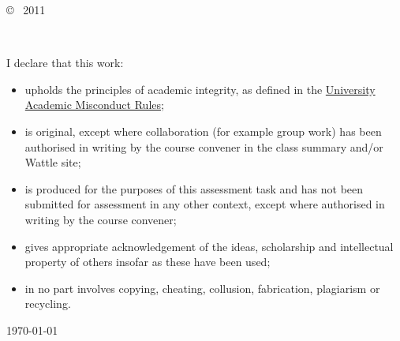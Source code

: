 \vspace*{14cm}
\begin{center}
  \makeatletter
  \copyright\ \@author{} 2011
  \makeatother
\end{center}
\noindent
\begin{center}
  \footnotesize{~} %
\end{center}
\noindent

\newpage

\vspace*{4cm}
I declare that this work:\\
\begin{itemize}
  \item[] upholds the principles of academic integrity, as defined in the \href{https://www.anu.edu.au/about/governance/legislation}{University Academic Misconduct Rules};
  \item[] is original, except where collaboration (for example group work) has been authorised in writing by the course convener in the class summary and/or Wattle site;
  \item[] is produced for the purposes of this assessment task and has not been submitted for assessment in any other context, except where authorised in writing by the course convener;
  \item[] gives appropriate acknowledgement of the ideas, scholarship and intellectual property of others insofar as these have been used;
  \item[] in no part involves copying, cheating, collusion, fabrication, plagiarism or recycling.
\end{itemize}

\vspace*{2cm}

\hspace{10cm}\makeatletter\@author\makeatother\par
\hspace{10cm}\today
